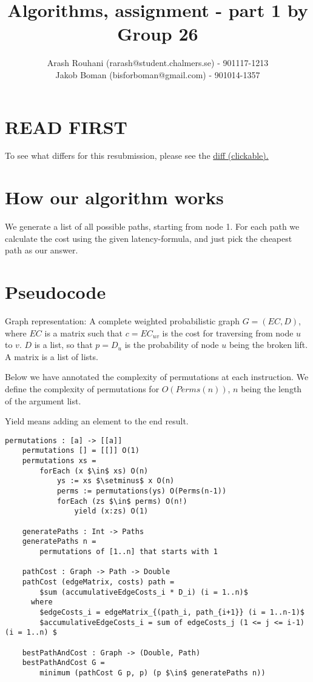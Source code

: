 \documentclass[a4paper,11pt]{article}
\title{Algorithms, assignment - part 1 by Group 26}
\author{Arash Rouhani (rarash@student.chalmers.se) - 901117-1213\\
        Jakob Boman (bisforboman@gmail.com) - 901014-1357}
\begin{document}
\maketitle

\section{READ FIRST}
To see what differs for this resubmission, please see the
\href{https://github.com/bisforboman/Algorithms-TIN092}{diff (clickable).}

\section{How our algorithm works}
We generate a list of all possible paths, starting from node 1. For each path we calculate the cost using the given latency-formula, and just pick the cheapest path as our answer.

\section{Pseudocode}
Graph representation: A complete weighted probabilistic graph $G = (EC, D)$, where $EC$ is a
matrix such that $c = EC_{uv}$ is the cost for traversing from node $u$ to $v$.
$D$ is a list, so that $p = D_u$ is the probability of node $u$ being the broken lift.
A matrix is a list of lists.

Below we have annotated the complexity of permutations at
each instruction.
We define the complexity of permutations for $O(Perms(n))$,
$n$ being the length of the argument list.

Yield means adding an element to the end result.

\begin{lstlisting}[mathescape]
    permutations : [a] -> [[a]]
    permutations [] = [[]] O(1)
    permutations xs =
        forEach (x $\in$ xs) O(n)
            ys := xs $\setminus$ x O(n)
            perms := permutations(ys) O(Perms(n-1))
            forEach (zs $\in$ perms) O(n!)
                yield (x:zs) O(1)

    generatePaths : Int -> Paths
    generatePaths n =
        permutations of [1..n] that starts with 1

    pathCost : Graph -> Path -> Double
    pathCost (edgeMatrix, costs) path = 
        $sum (accumulativeEdgeCosts_i * D_i) (i = 1..n)$
      where
        $edgeCosts_i = edgeMatrix_{(path_i, path_{i+1}} (i = 1..n-1)$
        $accumulativeEdgeCosts_i = sum of edgeCosts_j (1 <= j <= i-1) (i = 1..n) $
    
    bestPathAndCost : Graph -> (Double, Path)
    bestPathAndCost G = 
        minimum (pathCost G p, p) (p $\in$ generatePaths n))

\end{lstlisting}
\end{document}

